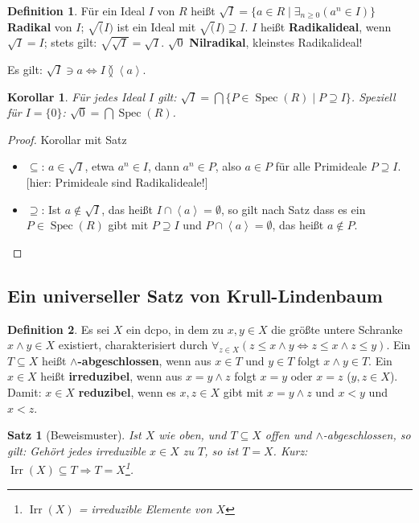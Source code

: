 \documentclass[headsepline=true,DIV=11]{scrartcl}
\newtheorem*{theorem}{Satz}
\newtheorem*{corollary}{Korollar}
\theoremstyle{definition}
\newtheorem*{definition}{Definition}
\newcommand{\Spec}{\operatorname{Spec}}
\newcommand{\Irr}{\operatorname{Irr}}
\begin{document}
\begin{definition}
  Für ein Ideal $I$ von $R$ heißt $\sqrt{I}=\{a\in R\mid\exists_{n\ge 0}(a^n\in I)\}$ {\bf Radikal} von $I$; $\sqrt(I)$ ist ein Ideal mit
  $\sqrt(I)\supseteq I$. $I$ heißt {\bf Radikalideal}, wenn $\sqrt{I}=I$; stets gilt: $\sqrt{\sqrt{I}}=\sqrt{I}$. $\sqrt{0}$ {\bf Nilradikal},
  kleinstes Radikalideal!
\end{definition}

Es gilt: $\sqrt{I}\ni a \Leftrightarrow I\between\left<a\right>$.

\begin{corollary}
  Für jedes Ideal $I$ gilt: $\sqrt{I}=\bigcap\{P\in\Spec(R)\mid P\supseteq I\}$. Speziell für $I=\{0\}$: $\sqrt{0}=\bigcap\Spec(R)$.
\end{corollary}

\begin{proof}{Korollar mit Satz}
  \begin{itemize}
    \item $\subseteq$: $a\in\sqrt{I}$, etwa $a^n\in I$, dann $a^n\in P$, also $a\in P$ für alle Primideale $P\supseteq I$. [hier: Primideale sind
      Radikalideale!]
    \item $\supseteq$: Ist $a\not\in\sqrt{I}$, das heißt $I\cap\left<a\right>=\emptyset$, so gilt nach Satz dass es ein $P\in\Spec(R)$ gibt mit
      $P\supseteq I$ und $P\cap\left<a\right>=\emptyset$, das heißt $a\not\in P$.
  \end{itemize}
\end{proof}

\subsection{Ein universeller Satz von Krull-Lindenbaum}

\begin{definition}
  Es sei $X$ ein dcpo, in dem zu $x,y\in X$ die größte untere Schranke $x\wedge y\in X$ existiert, charakterisiert durch $\forall_{z\in X}(z\le
  x\wedge y\Leftrightarrow z\le x\wedge z\le y)$. Ein $T\subseteq X$ heißt {\bf $\wedge$-abgeschlossen}, wenn aus $x\in T$ und $y\in T$ folgt $x\wedge
  y\in T$. Ein $x\in X$ heißt {\bf irreduzibel}, wenn aus $x=y\wedge z$ folgt $x=y$ oder $x=z$ ($y,z\in X$). Damit: $x\in X$ {\bf reduzibel}, wenn es
  $x,z\in X$ gibt mit $x=y\wedge z$ und $x<y$ und $x<z$.
\end{definition}

\begin{theorem}[Beweismuster]
  Ist $X$ wie oben, und $T\subseteq X$ offen und $\wedge$-abgeschlossen, so gilt: Gehört jedes irreduzible $x\in X$ zu $T$, so ist $T=X$. Kurz:
  $\Irr(X)\subseteq T\Rightarrow T=X$\footnote{$\Irr(X)$ = irreduzible Elemente von $X$}.
\end{theorem}
\end{document}
